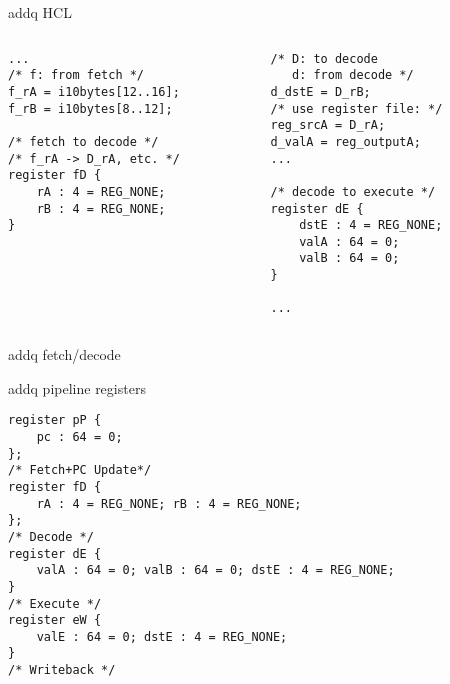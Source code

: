 \begin{frame}[fragile,label=addqHcl]{addq HCL}
\lstset{language=C,style=small}
\begin{columns}
\begin{column}{0.5\textwidth}
\begin{lstlisting}
...
/* f: from fetch */
f_rA = i10bytes[12..16];
f_rB = i10bytes[8..12];

/* fetch to decode */
/* f_rA -> D_rA, etc. */
register fD {
    rA : 4 = REG_NONE;
    rB : 4 = REG_NONE;
}

\end{lstlisting}
\end{column}
\begin{column}{0.5\textwidth}
\begin{lstlisting}
/* D: to decode 
   d: from decode */
d_dstE = D_rB;
/* use register file: */
reg_srcA = D_rA; 
d_valA = reg_outputA; 
...

/* decode to execute */
register dE {
    dstE : 4 = REG_NONE;
    valA : 64 = 0;
    valB : 64 = 0;
}

...
\end{lstlisting}
\end{column}
\end{columns}
\end{frame}

\begin{frame}[fragile,label=hcl2DStageCode]{addq fetch/decode}
\end{frame}

\begin{frame}[fragile,label=hcl2DPipe]{addq pipeline registers}
\begin{Verbatim}[fontsize=\fontsize{10}{11}\selectfont]
register pP {
    pc : 64 = 0;
};
/* Fetch+PC Update*/
register fD {
    rA : 4 = REG_NONE; rB : 4 = REG_NONE;
};
/* Decode */
register dE {
    valA : 64 = 0; valB : 64 = 0; dstE : 4 = REG_NONE;
}
/* Execute */
register eW {
    valE : 64 = 0; dstE : 4 = REG_NONE;
}
/* Writeback */
\end{Verbatim}
\end{frame}

